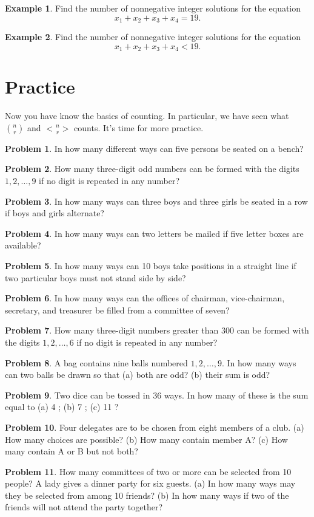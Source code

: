 \documentclass{exam}
\theoremstyle{definition}
\theoremstyle{definition}
\newtheorem{exmp}{Example}[section]
\theoremstyle{definition}
\newtheorem{prob}{Problem}[section]
\newcommand{\hbinom}[2]{\genfrac{<}{>}{0pt}{}{#1}{#2}}
\begin{document}
\begin{exmp}
Find the number of nonnegative integer solutions for the equation
$$
x_1+x_2+x_3+x_4 = 19 .
$$
\end{exmp}

\begin{exmp}
Find the number of nonnegative integer solutions for the equation
$$
x_1+x_2+x_3+x_4 < 19 .
$$
\end{exmp}

\section{Practice}
Now you have know the basics of counting. In particular, we have seen what $\binom{n}{r}$ and $\hbinom{n}{r}$ counts. It's time for more practice.

\begin{prob}
In how many different ways can five persons be seated on a bench?
\end{prob}
\begin{prob}
How many three-digit odd numbers can be formed with the digits $1,2, \ldots, 9$ if no digit is repeated in any number?
\end{prob}
\begin{prob}
In how many ways can three boys and three girls be seated in a row if boys and girls alternate?
\end{prob}
\begin{prob}
In how many ways can two letters be mailed if five letter boxes are available?
\end{prob}
\begin{prob}
In how many ways can 10 boys take positions in a straight line if two particular boys must not stand side by side?
\end{prob}
\begin{prob}
In how many ways can the offices of chairman, vice-chairman, secretary, and treasurer be filled from a committee of seven?
\end{prob}
\begin{prob}
How many three-digit numbers greater than 300 can be formed with the digits $1,2, \ldots, 6$ if no digit is repeated in any number?
\end{prob}
\begin{prob}
A bag contains nine balls numbered $1,2, \ldots, 9$. In how many ways can two balls be drawn so that (a) both are odd? (b) their sum is odd?
\end{prob}
\begin{prob}
Two dice can be tossed in 36 ways. In how many of these is the sum equal to (a) 4 ; (b) 7 ; (c) 11 ?
\end{prob}
\begin{prob}
Four delegates are to be chosen from eight members of a club. (a) How many choices are possible? (b) How many contain member A? (c) How many contain A or B but not both?
\end{prob}
\begin{prob}
How many committees of two or more can be selected from 10 people?
A lady gives a dinner party for six guests. (a) In how many ways may they be selected from among 10 friends? (b) In how many ways if two of the friends will not attend the party together?	
\end{prob}
\end{document}
